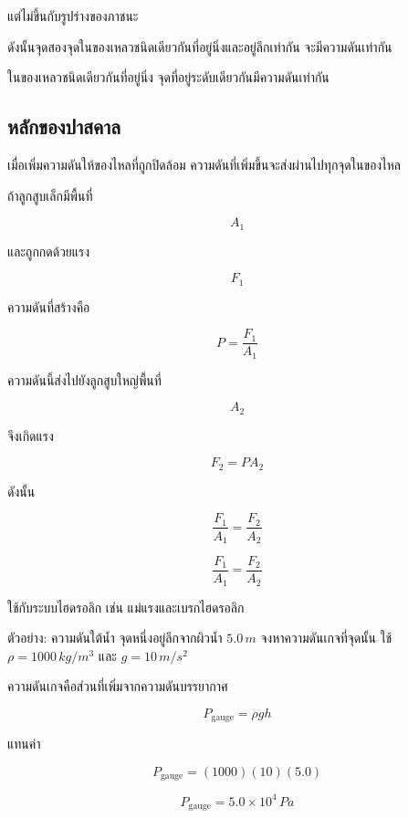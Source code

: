 แต่ไม่ขึ้นกับรูปร่างของภาชนะ

ดังนั้นจุดสองจุดในของเหลวชนิดเดียวกันที่อยู่นิ่งและอยู่ลึกเท่ากัน จะมีความดันเท่ากัน

\begin{tcolorbox}[title=หลักสำคัญของของเหลวอยู่นิ่ง]
ในของเหลวชนิดเดียวกันที่อยู่นิ่ง จุดที่อยู่ระดับเดียวกันมีความดันเท่ากัน
\end{tcolorbox}

\subsection{หลักของปาสคาล}

เมื่อเพิ่มความดันให้ของไหลที่ถูกปิดล้อม ความดันที่เพิ่มขึ้นจะส่งผ่านไปทุกจุดในของไหล

ถ้าลูกสูบเล็กมีพื้นที่

\[
A_1
\]

และถูกกดด้วยแรง

\[
F_1
\]

ความดันที่สร้างคือ

\[
P=\frac{F_1}{A_1}
\]

ความดันนี้ส่งไปยังลูกสูบใหญ่พื้นที่

\[
A_2
\]

จึงเกิดแรง

\[
F_2=PA_2
\]

ดังนั้น

\[
\frac{F_1}{A_1}=\frac{F_2}{A_2}
\]

\begin{tcolorbox}[title=หลักของปาสคาล]
\[
\frac{F_1}{A_1}=\frac{F_2}{A_2}
\]

ใช้กับระบบไฮดรอลิก เช่น แม่แรงและเบรกไฮดรอลิก
\end{tcolorbox}

\begin{examplebox}{ตัวอย่าง: ความดันใต้น้ำ}
จุดหนึ่งอยู่ลึกจากผิวน้ำ $5.0\,\si{m}$ จงหาความดันเกจที่จุดนั้น ใช้ $\rho=1000\,\si{kg/m^3}$ และ $g=10\,\si{m/s^2}$

ความดันเกจคือส่วนที่เพิ่มจากความดันบรรยากาศ

\[
P_{\text{gauge}}=\rho gh
\]

แทนค่า

\[
P_{\text{gauge}}=(1000)(10)(5.0)
\]

\[
P_{\text{gauge}}=5.0\times 10^4\,\si{Pa}
\]
\end{examplebox}

